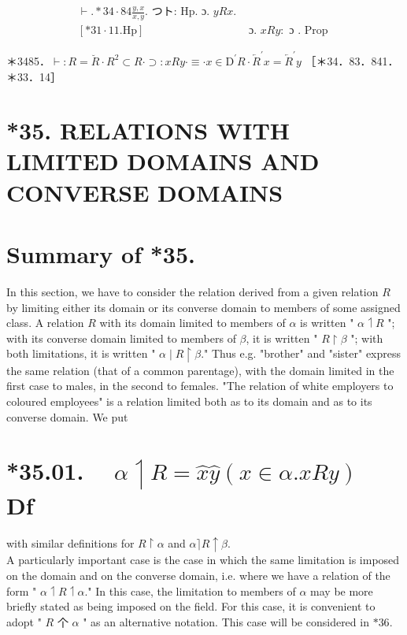 \documentclass[10pt]{article}
\begin{document}
$$
\begin{array}{ll}
\vdash . * 34 \cdot 84 \frac{y, x}{x, y} . \text { つト: Hp. ɔ. } y R x . & \\
{[* 31 \cdot 11 . \mathrm{Hp}]} & \text { ɔ. } x R y: \text { ɔ } . \text { Prop }
\end{array}
$$

＊3485．$\vdash: R=\breve{R} \cdot R^{2} \subset R \cdot \supset: x R y \cdot \equiv \cdot x \in \mathrm{D}^{\prime} R \cdot \overleftarrow{R}^{\prime} x=\overleftarrow{R}^{\prime} y$ ［＊34．83．841．＊33．14］

\section*{*35. RELATIONS WITH LIMITED DOMAINS AND CONVERSE DOMAINS}
\section*{Summary of *35.}
In this section, we have to consider the relation derived from a given relation $R$ by limiting either its domain or its converse domain to members of some assigned class. A relation $R$ with its domain limited to members of $\alpha$ is written " $\alpha \upharpoonleft R$ "; with its converse domain limited to members of $\beta$, it is written " $R \upharpoonright \beta$ "; with both limitations, it is written " $\alpha \mid R \upharpoonright \beta$." Thus e.g. "brother" and "sister" express the same relation (that of a common parentage), with the domain limited in the first case to males, in the second to females. "The relation of white employers to coloured employees" is a relation limited both as to its domain and as to its converse domain. We put

\section*{*35.01. $\quad \alpha \upharpoonleft R=\hat{x} \hat{y}(x \in \alpha . x R y) \quad$ Df}
with similar definitions for $R \upharpoonright \alpha$ and $\alpha\rceil R \uparrow \beta$.\\
A particularly important case is the case in which the same limitation is imposed on the domain and on the converse domain, i.e. where we have a relation of the form " $\alpha \upharpoonleft R \upharpoonleft \alpha$." In this case, the limitation to members of $\alpha$ may be more briefly stated as being imposed on the field. For this case, it is convenient to adopt " $R$ 个 $\alpha$ " as an alternative notation. This case will be considered in $* 36$.
\end{document}

